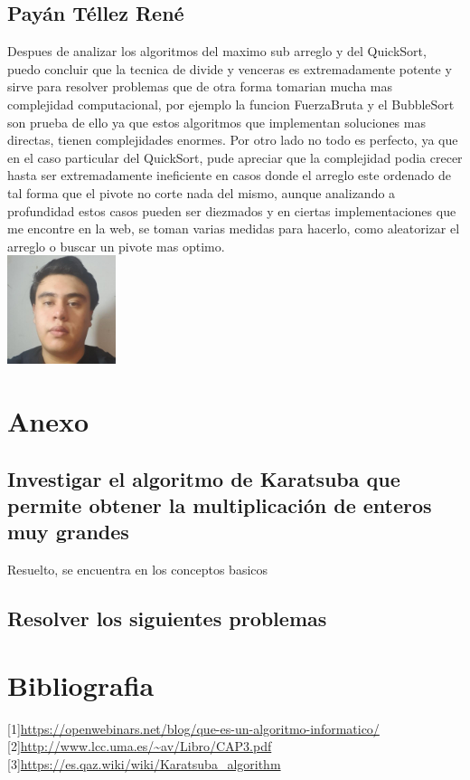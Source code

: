 \documentclass[spanish]{article}
\begin{document}
	\subsection{Payán Téllez René}
	Despues de analizar los algoritmos del maximo sub arreglo y del QuickSort, puedo concluir que la tecnica de divide y venceras es extremadamente potente y sirve para resolver problemas que de otra forma tomarian mucha mas complejidad computacional, por ejemplo la funcion FuerzaBruta y el BubbleSort son prueba de ello ya que estos algoritmos que implementan soluciones mas directas, tienen complejidades enormes. Por otro lado no todo es perfecto, ya que en el caso particular del QuickSort, pude apreciar que la complejidad podia crecer hasta ser extremadamente ineficiente en casos donde el arreglo este ordenado de tal forma que el pivote no corte nada del mismo, aunque analizando a profundidad estos casos pueden ser diezmados y en ciertas implementaciones que me encontre en la web, se toman varias medidas para hacerlo, como aleatorizar el arreglo o buscar un pivote mas optimo.\\
	\includegraphics[height=120px,width=120px]{Rene}
	\section{Anexo}			
	\subsection{Investigar el algoritmo de Karatsuba que permite obtener la multiplicación de enteros muy grandes}
	Resuelto, se encuentra en los conceptos basicos
	\subsection{Resolver los siguientes problemas}
	\section{Bibliografia}
		{[}1{]}\url{https://openwebinars.net/blog/que-es-un-algoritmo-informatico/}\\
		{[}2{]}\url{http://www.lcc.uma.es/~av/Libro/CAP3.pdf}\\
		{[}3{]}\url{https://es.qaz.wiki/wiki/Karatsuba_algorithm}\\
	
\end{document}
